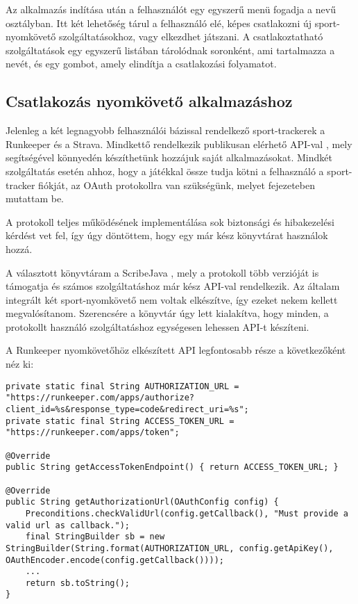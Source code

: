 Az alkalmazás indítása után a felhasználót egy egyszerű menü fogadja a  nevű osztályban. 
Itt két lehetőség tárul a felhasználó elé, képes csatlakozni új sport-nyomkövető szolgáltatásokhoz, vagy elkezdhet játszani. 
A csatlakoztatható szolgáltatások egy egyszerű listában tárolódnak soronként, ami tartalmazza a nevét, és egy gombot, amely elindítja a csatlakozási folyamatot. 

\subsection*{Csatlakozás nyomkövető alkalmazáshoz}
\label{trackerconnect}
Jelenleg a két legnagyobb felhasználói bázissal rendelkező sport-trackerek a Runkeeper és a Strava. 
Mindkettő rendelkezik publikusan elérhető API-val \cite{runkeeperapi} \cite{stravaapi}, mely segítségével könnyedén készíthetünk hozzájuk saját alkalmazásokat. 
Mindkét szolgáltatás esetén ahhoz, hogy a játékkal össze tudja kötni a felhasználó a sport-tracker fiókját, az OAuth protokollra van szükségünk, melyet  fejezeteben mutattam be. 

A protokoll teljes működésének implementálása sok biztonsági és hibakezelési kérdést vet fel, így úgy döntöttem, hogy egy már kész könyvtárat használok hozzá. 

A választott könyvtáram a ScribeJava \cite{scribejava}, mely a protokoll több verzióját is támogatja és számos szolgáltatáshoz már kész API-val rendelkezik. 
Az általam integrált két sport-nyomkövető nem voltak elkészítve, így ezeket nekem kellett megvalósítanom. 
Szerencsére a könyvtár úgy lett kialakítva, hogy minden, a protokollt használó szolgáltatáshoz egységesen lehessen API-t készíteni. 

A Runkeeper nyomkövetőhöz elkészített API legfontosabb része a következőként néz ki:

\begin{lstlisting}
private static final String AUTHORIZATION_URL = "https://runkeeper.com/apps/authorize?client_id=%s&response_type=code&redirect_uri=%s";
private static final String ACCESS_TOKEN_URL = "https://runkeeper.com/apps/token";

@Override
public String getAccessTokenEndpoint() { return ACCESS_TOKEN_URL; }

@Override
public String getAuthorizationUrl(OAuthConfig config) {
	Preconditions.checkValidUrl(config.getCallback(), "Must provide a valid url as callback.");
	final StringBuilder sb = new StringBuilder(String.format(AUTHORIZATION_URL, config.getApiKey(), OAuthEncoder.encode(config.getCallback())));
	...
	return sb.toString();
}
\end{lstlisting}

